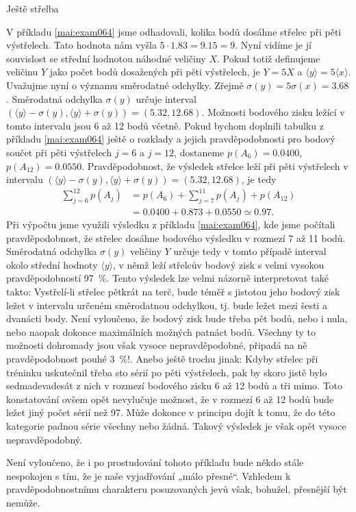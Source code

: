\begin{luaexambox}{Ještě střelba}
\begin{example}
    V příkladu \ref{mai:exam064} jsme odhadovali, kolika bodů dosáhne střelec při pěti výstřelech.
    Tato hodnota nám vyšla \(\num{5}\cdot\num{1.83} = \num{9.15} = 9\). Nyní vidíme je jí souvislost
    se střední hodnotou náhodné veličiny \(X\). Pokud totiž definujeme veličinu \(Y\) jako počet
    bodů dosažených při pěti výstřelech, je \(Y = 5X\) a \(\langle y \rangle = 5\langle x \rangle\).
    Uvažujme nyní o významu směrodatné odchylky. Zřejmě \(\sigma(y) = 5\sigma(x) = \num{3.68}\).
    Směrodatná odchylka \(\sigma(y)\) určuje interval \((\langle y \rangle - \sigma(y), \langle y
    \rangle + \sigma(y)) = (\num{5.32}, \num{12.68})\). Možnosti bodového zisku ležící v tomto
    intervalu jsou \num{6} až \num{12} bodů včetně. Pokud bychom doplnili tabulku z příkladu
    \ref{mai:exam064} ještě o rozklady a jejich pravděpodobnosti pro bodový součet při pěti
    výstřelech \(j = \num{6}\) a \(j = \num{12}\), dostaneme \(p(A_6) = \num{0.0400}\), \(p(A_{12})
    = \num{0.0550}\). Pravděpodobnost, že výsledek střelce leží při pěti výstřelech v intervalu
    \((\langle y \rangle - \sigma(y), \langle y \rangle + \sigma(y)) = (\num{5.32}, \num{12.68})\),
    je tedy
    \begin{align*}
      \sum_{j=6}^{12}p(A_j) &= p(A_6) + \sum_{j=7}^{11}p(A_j) + p(A_{12})                \\
                            &= \num{0.0400} + \num{0.873} + \num{0.0550} \simeq \num{0.97}.
    \end{align*}
    Při výpočtu jsme využili výsledku z příkladu \ref{mai:exam064}, kde jsme počítali
    pravděpodobnost, že střelec dosáhne bodového výsledku v rozmezí \num{7} až \num{11} bodů.
    Směrodatná odchylka \(\sigma(y)\) veličiny \(Y\) určuje tedy v tomto případě interval okolo
    střední hodnoty \(\langle y \rangle\), v němž leží střelcův bodový zisk s velmi vysokou
    pravděpodobností \SI{97}{\percent}. Tento výsledek lze velmi názorně interpretovat také takto:
    Vystřelí-li střelec pětkrát na terč, bude téměř s jistotou jeho bodový zisk ležet v intervalu
    určeném směrodatnou odchylkou, tj. bude ležet mezi šesti a dvanácti body. Není vyloučeno, že
    bodový zisk bude třeba pět bodů, nebo i nula, nebo naopak dokonce maximálních možných patnáct
    bodů. Všechny ty to možnosti dohromady jsou však vysoce nepravděpodobné, připadá na ně
    pravděpodobnost pouhé \SI{3}{\percent}!. Anebo ještě trochu jinak: Kdyby střelec při tréninku
    uskutečnil třeba sto sérií po pěti výstřelech, pak by skoro jistě bylo sedmadevadesát z nich v
    rozmezí bodového zisku \num{6} až \num{12} bodů a tři mimo. Toto konstatování ovšem opět
    nevylučuje možnost, že v rozmezí \num{6} až \num{12} bodů bude ležet jiný počet sérií než
    \num{97}. Může dokonce v principu dojít k tomu, že do této kategorie padnou série všechny nebo
    žádná. Takový výsledek je však opět vysoce nepravděpodobný.
    
    Není vyloučeno, že i po prostudování tohoto příkladu bude někdo stále nespokojen s tím, že je
    naše vyjadřování „málo přesné“. Vzhledem k pravděpodobnostnímu charakteru posuzovaných jevů
    však, bohužel, přesnější být nemůže.
  \end{example}
\end{luaexambox}
